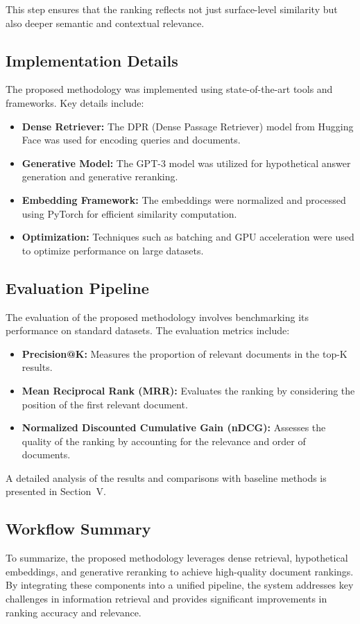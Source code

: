 This step ensures that the ranking reflects not just surface-level similarity but also deeper semantic and contextual relevance.

\subsection{Implementation Details}
The proposed methodology was implemented using state-of-the-art tools and frameworks. Key details include:
\begin{itemize}
    \item \textbf{Dense Retriever:} The DPR (Dense Passage Retriever) model from Hugging Face was used for encoding queries and documents.
    \item \textbf{Generative Model:} The GPT-3 model was utilized for hypothetical answer generation and generative reranking.
    \item \textbf{Embedding Framework:} The embeddings were normalized and processed using PyTorch for efficient similarity computation.
    \item \textbf{Optimization:} Techniques such as batching and GPU acceleration were used to optimize performance on large datasets.
\end{itemize}

\subsection{Evaluation Pipeline}
The evaluation of the proposed methodology involves benchmarking its performance on standard datasets. The evaluation metrics include:
\begin{itemize}
    \item \textbf{Precision@K:} Measures the proportion of relevant documents in the top-K results.
    \item \textbf{Mean Reciprocal Rank (MRR):} Evaluates the ranking by considering the position of the first relevant document.
    \item \textbf{Normalized Discounted Cumulative Gain (nDCG):} Assesses the quality of the ranking by accounting for the relevance and order of documents.
\end{itemize}

A detailed analysis of the results and comparisons with baseline methods is presented in Section~V.

\subsection{Workflow Summary}
To summarize, the proposed methodology leverages dense retrieval, hypothetical embeddings, and generative reranking to achieve high-quality document rankings. By integrating these components into a unified pipeline, the system addresses key challenges in information retrieval and provides significant improvements in ranking accuracy and relevance.
